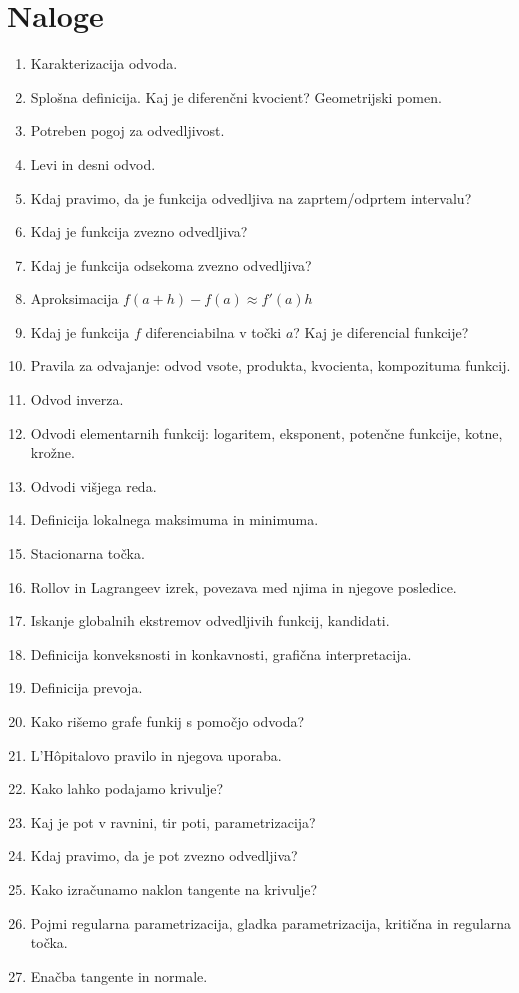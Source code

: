 \documentclass[a4paper,12pt]{report}
\begin{document}
\section*{Naloge}
\begin{enumerate}
    \item Karakterizacija odvoda.
    \item Splošna definicija. Kaj je diferenčni kvocient? Geometrijski pomen.
    \item Potreben pogoj za odvedljivost.
    \item Levi in desni odvod.
    \item Kdaj pravimo, da je funkcija odvedljiva na zaprtem/odprtem intervalu?
    \item Kdaj je funkcija zvezno odvedljiva?
    \item Kdaj je funkcija odsekoma zvezno odvedljiva?
    \item Aproksimacija $ f(a+h) - f(a) \approx f'(a) h $
    \item Kdaj je funkcija $f$ diferenciabilna v točki $a$? Kaj je diferencial funkcije?
    \item Pravila za odvajanje: odvod vsote, produkta, kvocienta, kompozituma funkcij.
    \item Odvod inverza.
    \item Odvodi elementarnih funkcij: logaritem, eksponent, potenčne funkcije, kotne, krožne.
    \item Odvodi višjega reda.
    \item Definicija lokalnega maksimuma in minimuma.
    \item Stacionarna točka.
    \item Rollov in Lagrangeev izrek, povezava med njima in njegove posledice.
    \item Iskanje globalnih ekstremov odvedljivih funkcij, kandidati.
    \item Definicija konveksnosti in konkavnosti, grafična interpretacija.
    \item Definicija prevoja.
    \item Kako rišemo grafe funkij s pomočjo odvoda?
    \item L'Hôpitalovo pravilo in njegova uporaba.
    \item Kako lahko podajamo krivulje?
    \item Kaj je pot v ravnini, tir poti, parametrizacija?
    \item Kdaj pravimo, da je pot zvezno odvedljiva?
    \item Kako izračunamo naklon tangente na krivulje?
    \item Pojmi regularna parametrizacija, gladka parametrizacija, kritična in regularna točka.
    \item Enačba tangente in normale.
\end{enumerate}
\end{document}
